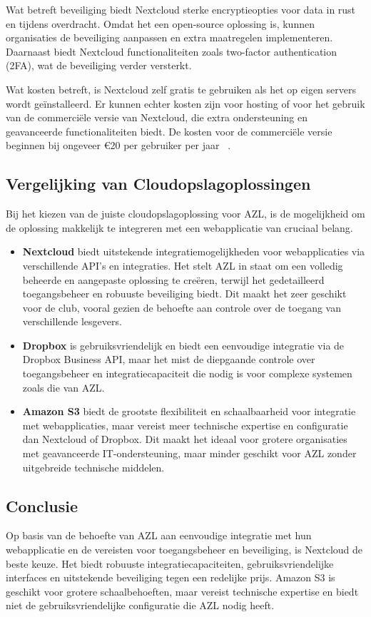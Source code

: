 Wat betreft beveiliging biedt Nextcloud sterke encryptieopties voor data in rust en tijdens overdracht. Omdat het een open-source oplossing is, kunnen organisaties de beveiliging aanpassen en extra maatregelen implementeren. Daarnaast biedt Nextcloud functionaliteiten zoals two-factor authentication (2FA), wat de beveiliging verder versterkt.

Wat kosten betreft, is Nextcloud zelf gratis te gebruiken als het op eigen servers wordt geïnstalleerd. Er kunnen echter kosten zijn voor hosting of voor het gebruik van de commerciële versie van Nextcloud, die extra ondersteuning en geavanceerde functionaliteiten biedt. De kosten voor de commerciële versie beginnen bij ongeveer €20 per gebruiker per jaar ~\autocite{Nextcloud2024}.

\subsection{Vergelijking van Cloudopslagoplossingen}
Bij het kiezen van de juiste cloudopslagoplossing voor AZL, is de mogelijkheid om de oplossing makkelijk te integreren met een webapplicatie van cruciaal belang.

\begin{itemize}
    \item \textbf{Nextcloud} biedt uitstekende integratiemogelijkheden voor webapplicaties via verschillende API's en integraties. Het stelt AZL in staat om een volledig beheerde en aangepaste oplossing te creëren, terwijl het gedetailleerd toegangsbeheer en robuuste beveiliging biedt. Dit maakt het zeer geschikt voor de club, vooral gezien de behoefte aan controle over de toegang van verschillende lesgevers.
    \item \textbf{Dropbox} is gebruiksvriendelijk en biedt een eenvoudige integratie via de Dropbox Business API, maar het mist de diepgaande controle over toegangsbeheer en integratiecapaciteit die nodig is voor complexe systemen zoals die van AZL.
    \item \textbf{Amazon S3} biedt de grootste flexibiliteit en schaalbaarheid voor integratie met webapplicaties, maar vereist meer technische expertise en configuratie dan Nextcloud of Dropbox. Dit maakt het ideaal voor grotere organisaties met geavanceerde IT-ondersteuning, maar minder geschikt voor AZL zonder uitgebreide technische middelen.
\end{itemize}

\subsection{Conclusie}
Op basis van de behoefte van AZL aan eenvoudige integratie met hun webapplicatie en de vereisten voor toegangsbeheer en beveiliging, is Nextcloud de beste keuze. Het biedt robuuste integratiecapaciteiten, gebruiksvriendelijke interfaces en uitstekende beveiliging tegen een redelijke prijs. Amazon S3 is geschikt voor grotere schaalbehoeften, maar vereist technische expertise en biedt niet de gebruiksvriendelijke configuratie die AZL nodig heeft.
